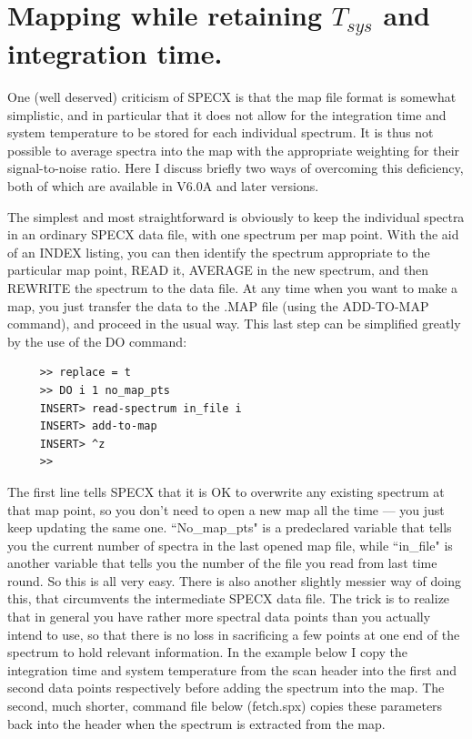 \documentclass[11pt,twoside]{report}
\begin{document}
\newpage
\section{Mapping while retaining $T_{sys}$ and integration time.}

   One (well deserved) criticism of SPECX is that the map file format
is somewhat simplistic, and in particular that it does not allow for the
integration time and system temperature to be stored for each individual
spectrum. It is thus not possible to average spectra into the map with
the appropriate weighting for their signal-to-noise ratio. 
Here I discuss briefly two ways of overcoming this deficiency, both
of which are available in V6.0A and later versions.

The simplest and most straightforward is obviously to keep the individual
spectra in an ordinary SPECX data file, with one spectrum per map point.
With the aid of an INDEX listing, you can then identify the spectrum
appropriate to the particular map point, READ it, AVERAGE in the new
spectrum, and then REWRITE the spectrum to the data file. At any time when
you want to make a map, you just transfer the data to the .MAP file
(using the ADD-TO-MAP command), and proceed in the usual way. This last
step can be simplified greatly by the use of the DO command:

\begin{verbatim}
     >> replace = t
     >> DO i 1 no_map_pts
     INSERT> read-spectrum in_file i
     INSERT> add-to-map
     INSERT> ^z
     >>
\end{verbatim}

The first line tells SPECX that it is OK to overwrite any existing spectrum at
that map point, so you don't need to open a new map all the time --- you just
keep updating the same one. ``No\_map\_pts" is a predeclared variable that tells you
the current number of spectra in the last opened map file, while ``in\_file" is
another variable that tells you the number of the file you read from last time
round. So this is all very easy. There is also another slightly messier way of
doing this, that circumvents the intermediate SPECX data file. The trick is to
realize that in general you have rather more spectral data points than you 
actually intend to use, so that there is no loss in sacrificing a few points
at one end of the spectrum to hold relevant information. In the example below
I copy the integration time and system temperature from the scan header into
the first and second data points respectively before adding the spectrum into
the map. The second, much shorter, command file below (fetch.spx) copies these
parameters back into the header when the spectrum is extracted from the map.
\end{document}
